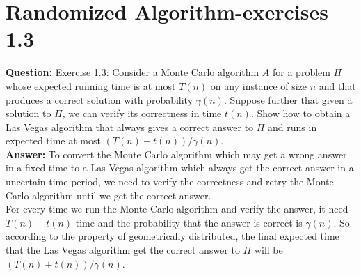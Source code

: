 \documentclass[12pt]{article}
\begin{document}
\section{Randomized Algorithm-exercises 1.3}
\textbf{Question:}
Exercise 1.3: Consider a Monte Carlo algorithm $A$ for a problem $\Pi$ whose expected running time is at most $T(n)$ on any instance of size $n$ and that produces a correct solution with probability $\gamma(n)$. Suppose further that given a solution to $\Pi$, we can verify its correctness in time $t(n)$. Show how to obtain a Las Vegas algorithm that always gives a correct answer to $\Pi$ and runs in expected time at most $(T(n) + t(n))/\gamma(n)$.\\
\textbf{Answer:}
To convert the Monte Carlo algorithm which may get a wrong answer in a fixed time to a Las Vegas algorithm which always get the correct answer in a uncertain time period, we need to verify the correctness and retry the Monte Carlo algorithm until we get the correct answer.\\
For every time we run the Monte Carlo algorithm and verify the answer, it need $T(n) + t(n)$ time and the probability that the answer is correct is $\gamma(n)$. So according to the property of geometrically distributed, the final expected time that the Las Vegas algorithm get the correct answer to $\Pi$ will be $(T(n) + t(n))/\gamma(n)$.
\end{document}
